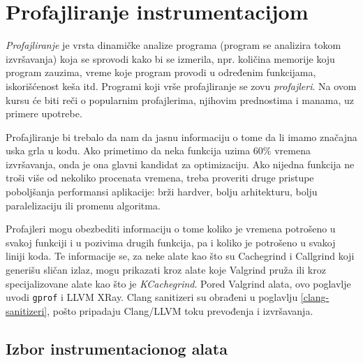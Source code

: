 \section{Profajliranje instrumentacijom}\label{profajliranje-instrumentacijom}

\emph{Profajliranje} je vrsta dinamičke analize programa (program se analizira tokom izvršavanja) koja se sprovodi kako bi se izmerila, npr. količina memorije koju program zauzima, vreme koje program provodi u određenim funkcijama, iskorišćenost keša itd. Programi koji vrše profajliranje se zovu \emph{profajleri}. Na ovom kursu će biti reči o popularnim profajlerima, njihovim prednostima i manama, uz primere upotrebe.

Profajliranje bi trebalo da nam da jasnu informaciju o tome da li imamo značajna uska grla u kodu. Ako primetimo da neka funkcija uzima 60\% vremena izvršavanja, onda je ona glavni kandidat za optimizaciju. Ako nijedna funkcija ne troši više od nekoliko procenata vremena, treba proveriti druge pristupe poboljšanja performansi aplikacije: brži hardver, bolju arhitekturu, bolju paralelizaciju ili promenu algoritma.

Profajleri mogu obezbediti informaciju o tome koliko je vremena potrošeno u svakoj funkciji i u pozivima drugih funkcija, pa i koliko je potrošeno u svakoj liniji koda. Te informacije se, za neke alate kao što su Cachegrind i Callgrind koji generišu sličan izlaz, mogu prikazati kroz alate koje Valgrind pruža ili kroz specijalizovane alate kao što je \emph{KCachegrind}. Pored Valgrind alata, ovo poglavlje uvodi \texttt{gprof} i LLVM XRay. Clang sanitizeri su obrađeni u poglavlju \ref{clang-sanitizeri}, pošto pripadaju Clang/LLVM toku prevođenja i izvršavanja.

\subsection{Izbor instrumentacionog alata}\label{izbor-instrumentacionog-alata}

